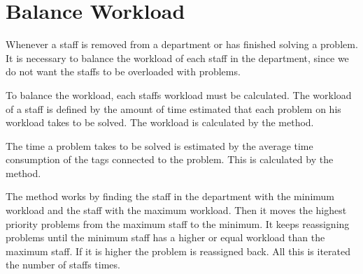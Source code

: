 \section{Balance Workload}
Whenever a staff is removed from a department or has finished solving a problem. 
It is necessary to balance the workload of each staff in the department, since we do not want the staffs to be overloaded with problems. 

To balance the workload, each staffs workload must be calculated. 
The workload of a staff is defined by the amount of time estimated that each problem on his workload takes to be solved. The workload is calculated by the  method.

The time a problem takes to be solved is estimated by the average time consumption of the tags connected to the problem. This is calculated by the  method.

The  method works by finding the staff in the department with the minimum workload and the staff with the maximum workload. Then it moves the highest priority problems from the maximum staff to the minimum. It keeps reassigning problems until the minimum staff has a higher or equal workload than the maximum staff. If it is higher the problem is reassigned back. All this is iterated the number of staffs times. 

